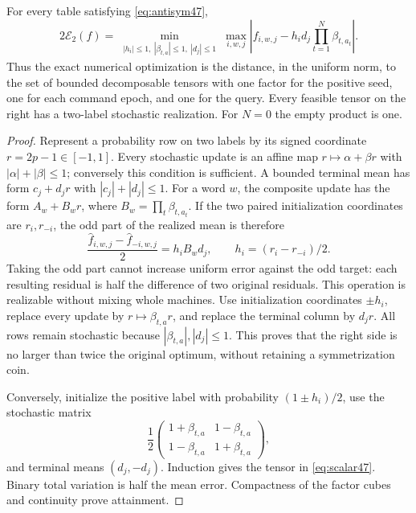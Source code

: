\begin{theorem}\label{thm:scalar47}
For every table satisfying \eqref{eq:antisym47},
\begin{equation}\label{eq:scalar47}
 2\mathcal E_2(f)=
 \min_{\substack{|h_i|\le1,\ |\beta_{t,a}|\le1,\ |d_j|\le1}}
 \max_{i,w,j}
 \left|f_{i,w,j}-h_i d_j\prod_{t=1}^N\beta_{t,a_t}\right|.
\end{equation}
Thus the exact numerical optimization is the distance, in the uniform
norm, to the set of bounded decomposable tensors with one factor for
the positive seed, one for each command epoch, and one for the query.
Every feasible tensor on the right has a two-label stochastic
realization. For $N=0$ the empty product is one.
\end{theorem}
\begin{proof}
Represent a probability row on two labels by its signed coordinate
$r=2p-1\in[-1,1]$. Every stochastic update is an affine map
$r\mapsto\alpha+\beta r$ with $|\alpha|+|\beta|\le1$;
conversely this condition is sufficient. A bounded terminal mean has
form $c_j+d_jr$ with $|c_j|+|d_j|\le1$.
For a word $w$, the composite update has the form
$A_w+B_wr$, where $B_w=\prod_t\beta_{t,a_t}$.
If the two paired initialization coordinates are $r_i,r_{-i}$,
the odd part of the realized mean is therefore
\[
 \frac{\widehat f_{i,w,j}-\widehat f_{-i,w,j}}2
     =h_i B_w d_j,\qquad h_i=(r_i-r_{-i})/2.
\]
Taking the odd part cannot increase uniform error against the odd
target: each resulting residual is half the difference of two original
residuals. This operation is realizable without mixing whole machines.
Use initialization coordinates $\pm h_i$, replace every update by
$r\mapsto\beta_{t,a}r$, and replace the terminal column by $d_jr$.
All rows remain stochastic because $|\beta_{t,a}|,|d_j|\le1$.
This proves that the right side is no larger than twice the original
optimum, without retaining a symmetrization coin.

Conversely, initialize the positive label with probability
$(1\pm h_i)/2$, use the stochastic matrix
\begin{equation}\label{eq:binaryrow47}
 \frac12\begin{pmatrix}1+\beta_{t,a}&1-\beta_{t,a}\\
                       1-\beta_{t,a}&1+\beta_{t,a}\end{pmatrix},
\end{equation}
and terminal means $(d_j,-d_j)$. Induction gives the tensor in
\eqref{eq:scalar47}. Binary total variation is half the mean error.
Compactness of the factor cubes and continuity prove attainment.
\end{proof}

